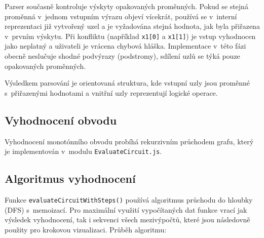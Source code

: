 Parser současně kontroluje výskyty opakovaných proměnných. Pokud se stejná proměnná v~jednom vstupním výrazu objeví vícekrát, používá se v~interní reprezentaci již vytvořený uzel a je vyžadována stejná hodnota, jak byla přiřazena v~prvním výskytu. Při konfliktu (například \texttt{x1[0]} a \texttt{x1[1]}) je vstup vyhodnocen jako neplatný a uživateli je vrácena chybová hláška. Implementace v~této fázi obecně neslučuje shodné podvýrazy (podstromy), sdílení uzlů se týká pouze opakovaných proměnných.

Výsledkem parsování je orientovaná struktura, kde vstupní uzly jsou proměnné s~přiřazenými hodnotami a vnitřní uzly reprezentují logické operace.

\subsection{Vyhodnocení obvodu}
\label{sec:MCVPEvaluationImpl}

Vyhodnocení monotónního obvodu probíhá rekurzivním průchodem grafu, který je implementován v~modulu \texttt{EvaluateCircuit.js}.

\subsection{Algoritmus vyhodnocení}
\label{sec:MCVPAlgorithmImpl}

Funkce \texttt{evaluateCircuitWithSteps()} používá algoritmus průchodu do hloubky (DFS) s~memoizací. Pro maximální využití vypočítaných dat funkce vrací jak výsledek vyhodnocení, tak i sekvenci všech mezivýpočtů, které jsou následovně použity pro krokovou vizualizaci. Průběh algoritmu:

